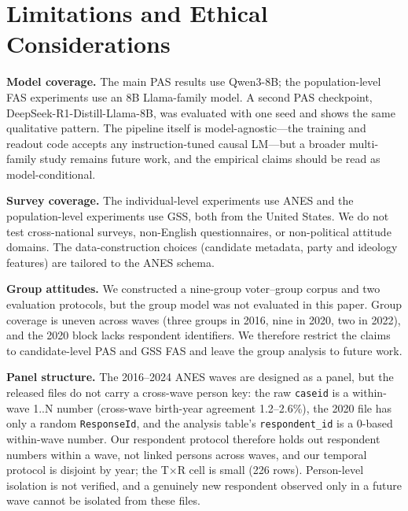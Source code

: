 \section{Limitations and Ethical
Considerations}\label{limitations-and-ethical-considerations}

\textbf{Model coverage.} The main PAS results use Qwen3-8B; the
population-level FAS experiments use an 8B Llama-family model. A second
PAS checkpoint, DeepSeek-R1-Distill-Llama-8B, was evaluated with one
seed and shows the same qualitative pattern. The pipeline itself is
model-agnostic---the training and readout code accepts any
instruction-tuned causal LM---but a broader multi-family study remains
future work, and the empirical claims should be read as
model-conditional.

\textbf{Survey coverage.} The individual-level experiments use ANES and
the population-level experiments use GSS, both from the United States.
We do not test cross-national surveys, non-English questionnaires, or
non-political attitude domains. The data-construction choices (candidate
metadata, party and ideology features) are tailored to the ANES schema.

\textbf{Group attitudes.} We constructed a nine-group voter--group
corpus and two evaluation protocols, but the group model was not
evaluated in this paper. Group coverage is uneven across waves (three
groups in 2016, nine in 2020, two in 2022), and the 2020 block lacks
respondent identifiers. We therefore restrict the claims to
candidate-level PAS and GSS FAS and leave the group analysis to future
work.

\textbf{Panel structure.} The 2016--2024 ANES waves are designed as a
panel, but the released files do not carry a cross-wave person key: the
raw \texttt{caseid} is a within-wave 1..N number (cross-wave birth-year
agreement 1.2--2.6\%), the 2020 file has only a random
\texttt{ResponseId}, and the analysis table's \texttt{respondent\_id} is
a 0-based within-wave number. Our respondent protocol therefore holds
out respondent numbers within a wave, not linked persons across waves,
and our temporal protocol is disjoint by year; the T\(\times\)R cell is
small (226 rows). Person-level isolation is not verified, and a
genuinely new respondent observed only in a future wave cannot be
isolated from these files.

